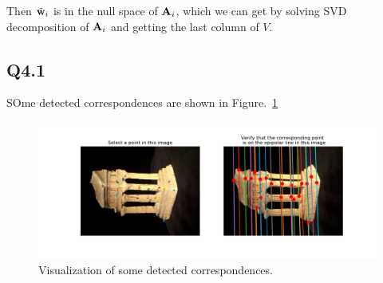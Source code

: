\documentclass[11pt]{article}
\begin{document}
Then $\tilde{\mathbf{w}}_i$ is in the null space of $\mathbf{A}_i$, which we can get by solving SVD decomposition of $\mathbf{A}_i$ and getting the last column of $V$.

%
%

\newpage

\subsection*{Q4.1}

SOme detected correspondences are shown in Figure.~\ref{fig:q4.1}

\begin{figure}[h!]
    \centering
    \includegraphics[width=.8\linewidth]{../results/q4_1.png}
    \caption{Visualization of some detected correspondences. }
    \label{fig:q4.1}
\end{figure}
\end{document}
